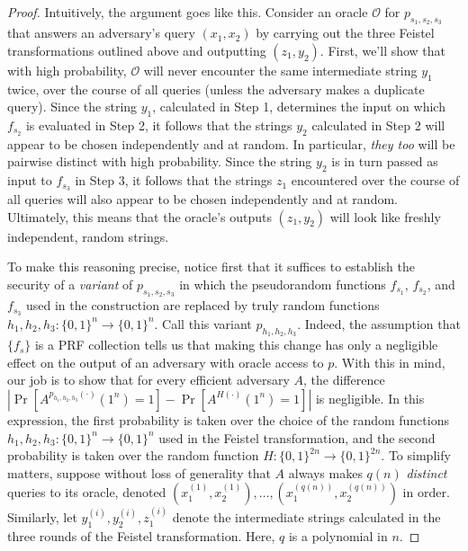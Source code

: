 \begin{proof}
Intuitively, the argument goes like this. Consider an oracle
\(\mathcal{O}\) for \(p_{s_1,s_2,s_3}\) that answers an adversary's
query \((x_1, x_2)\) by carrying out the three Feistel transformations
outlined above and outputting \((z_1, y_2)\). First, we'll show that
with high probability, \(\mathcal{O}\) will never encounter the same
intermediate string \(y_1\) twice, over the course of all queries
(unless the adversary makes a duplicate query). Since the string
\(y_1\), calculated in Step 1, determines the input on which \(f_{s_2}\)
is evaluated in Step 2, it follows that the strings \(y_2\) calculated
in Step 2 will appear to be chosen independently and at random. In
particular, \emph{they too} will be pairwise distinct with high
probability. Since the string \(y_2\) is in turn passed as input to
\(f_{s_3}\) in Step 3, it follows that the strings \(z_1\) encountered
over the course of all queries will also appear to be chosen
independently and at random. Ultimately, this means that the oracle's
outputs \((z_1, y_2)\) will look like freshly independent, random
strings.

To make this reasoning precise, notice first that it suffices to
establish the security of a \emph{variant} of \(p_{s_1,s_2,s_3}\) in
which the pseudorandom functions \(f_{s_1}\), \(f_{s_2}\), and
\(f_{s_3}\) used in the construction are replaced by truly random
functions \(h_1,h_2,h_3 : \{0,1\}^n \to \{0,1\}^n\). Call this variant
\(p_{h_1,h_2,h_3}\). Indeed, the assumption that \(\{f_s\}\) is a PRF
collection tells us that making this change has only a negligible effect
on the output of an adversary with oracle access to \(p\). With this in
mind, our job is to show that for every efficient adversary \(A\), the
difference
\(|\Pr[A^{p_{h_1,h_2,h_3}(\cdot)}(1^n)=1] - \Pr[A^{H(\cdot)}(1^n)=1]|\)
is negligible. In this expression, the first probability is taken over
the choice of the random functions
\(h_1,h_2,h_3 :\{0,1\}^n \to \{0,1\}^n\) used in the Feistel
transformation, and the second probability is taken over the random
function \(H : \{0,1\}^{2n} \to \{0,1\}^{2n}\). To simplify matters,
suppose without loss of generality that \(A\) always makes \(q(n)\)
\emph{distinct} queries to its oracle, denoted
\((x_1^{(1)}, x_2^{(1)}), \ldots, (x_1^{(q(n))}, x_2^{(q(n))})\) in
order. Similarly, let \(y_1^{(i)}, y_2^{(i)}, z_1^{(i)}\) denote the
intermediate strings calculated in the three rounds of the Feistel
transformation. Here, \(q\) is a polynomial in \(n\).


\end{proof}
